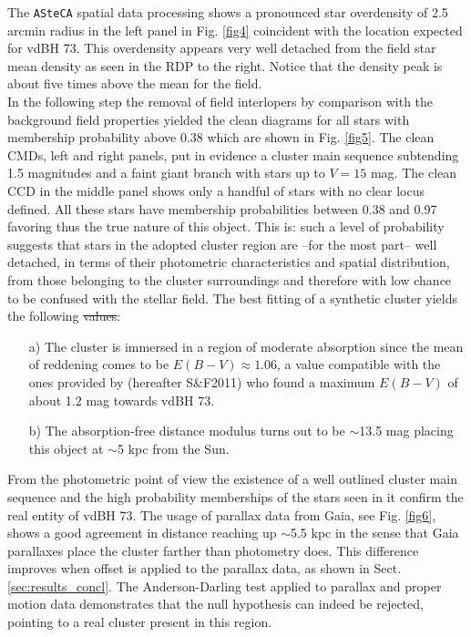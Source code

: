 \documentclass[draft]{aa}
\providecommand{\DIFaddtex}[1]{{\protect\color{blue}\uwave{#1}}} %
\providecommand{\DIFdeltex}[1]{{\protect\color{red}\sout{#1}}}                      %
\providecommand{\DIFaddbegin}{} %
\providecommand{\DIFaddend}{} %
\providecommand{\DIFdelbegin}{} %
\providecommand{\DIFdelend}{} %
\providecommand{\DIFadd}[1]{\texorpdfstring{\DIFaddtex{#1}}{#1}} %
\providecommand{\DIFdel}[1]{\texorpdfstring{\DIFdeltex{#1}}{}} %
\newcommand{\DIFscaledelfig}{0.5}
\newlength{\DIFdelgraphicswidth} %
\newlength{\DIFdelgraphicsheight} %
\newcommand{\DIFaddincludegraphics}[2][]{{\color{blue}\fbox{\DIFOincludegraphics[#1]{#2}}}} %
\newcommand{\DIFdelincludegraphics}[2][]{%
\sbox{\DIFdelgraphicsbox}{\DIFOincludegraphics[#1]{#2}}%
\settoboxwidth{\DIFdelgraphicswidth}{\DIFdelgraphicsbox} %
\settoboxtotalheight{\DIFdelgraphicsheight}{\DIFdelgraphicsbox} %
\scalebox{\DIFscaledelfig}{%
\parbox[b]{\DIFdelgraphicswidth}{\usebox{\DIFdelgraphicsbox}\\[-\baselineskip] \rule{\DIFdelgraphicswidth}{0em}}\llap{\resizebox{\DIFdelgraphicswidth}{\DIFdelgraphicsheight}{%
\setlength{\unitlength}{\DIFdelgraphicswidth}%
\begin{picture}(1,1)%
\thicklines\linethickness{2pt} %
{\color[rgb]{1,0,0}\put(0,0){\framebox(1,1){}}}%
{\color[rgb]{1,0,0}\put(0,0){\line( 1,1){1}}}%
{\color[rgb]{1,0,0}\put(0,1){\line(1,-1){1}}}%
\end{picture}%
}\hspace*{3pt}}} %
} %
\DeclareRobustCommand{\DIFaddbegin}{\DIFOaddbegin \let\includegraphics\DIFaddincludegraphics} %
\DeclareRobustCommand{\DIFaddend}{\DIFOaddend \let\includegraphics\DIFOincludegraphics} %
\DeclareRobustCommand{\DIFdelbegin}{\DIFOdelbegin \let\includegraphics\DIFdelincludegraphics} %
\DeclareRobustCommand{\DIFdelend}{\DIFOaddend \let\includegraphics\DIFOincludegraphics} %
\begin{document}
The \texttt{ASteCA} spatial data processing shows a pronounced star overdensity
of 2.5 arcmin radius in the left panel in Fig. \ref{fig4} coincident with the
location expected for vdBH 73. This overdensity appears very well
detached from the field star mean density as seen in the RDP to the right.
Notice that the density peak is about five times above the mean for the field.\\

In the following step the removal of field interlopers by comparison with the
background field properties yielded the clean diagrams for all stars with
membership probability above 0.38 which are shown in Fig. \ref{fig5}. The
clean CMDs, left and right panels, put in evidence a cluster main sequence
subtending 1.5 magnitudes and a faint giant branch with stars up to $V=15$ mag.
The clean CCD in the middle panel shows only a handful of stars with no clear
locus defined. All these stars have membership probabilities between 0.38 and
0.97 favoring thus the true nature of this object. This is: such a level of
probability suggests that stars in the adopted cluster region are --for the
most part-- well detached, in terms of their photometric characteristics and
spatial distribution, from those belonging to the cluster surroundings and
therefore with low chance to be confused with the stellar field. The best
fitting of a synthetic cluster yields the following \DIFdelbegin \DIFdel{values}\DIFdelend \DIFaddbegin \DIFadd{results}\DIFaddend :

\begin{itemize}
\item [a)] The cluster is immersed in a region of moderate absorption
since the mean of reddening comes to be $E(B-V)\approx1.06$, a value compatible
with the ones provided by \cite{Schlafly_2011} (hereafter S\&F2011) who
found a maximum $E(B-V)$ of about 1.2 mag towards vdBH 73.
\item [b)] The absorption-free distance modulus turns out to be $\sim$13.5 mag
placing this object at $\sim$5 kpc from the Sun.
\end{itemize}

From the photometric point of view the existence of a well outlined cluster main
sequence and the high probability memberships of the stars seen in it confirm
the real entity of vdBH 73. The usage of parallax data from Gaia, see Fig. 
\ref{fig6}, shows a good agreement in distance reaching up $\sim$5.5 kpc in the
sense that Gaia parallaxes place the cluster farther than
photometry does. This difference improves when offset is applied to the
parallax data, as shown in Sect. \ref{sec:results_concl}.
The Anderson-Darling test applied to parallax and proper motion data
demonstrates that the null hypothesis can indeed be rejected, pointing to
a real cluster present in this region.\\
\end{document}
